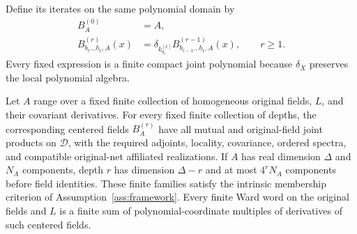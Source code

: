Define its iterates on the same polynomial domain by
\[
 \begin{aligned}
 B_A^{(0)}&=A,\\
 B^{(r)}_{b_r\ldots b_1,A}(x)
   &=\delta_{k_{b_r}^{[x]}}
       B^{(r-1)}_{b_{r-1}\ldots b_1,A}(x),\qquad r\ge1.
 \end{aligned}
\]
Every fixed expression is a finite compact joint polynomial because
\(\delta_X\) preserves the local polynomial algebra.

\begin{proposition}
\label{R:centered-families}
Let $A$ range over a fixed finite collection of homogeneous original
fields, $L$, and their covariant derivatives.  For every fixed finite
collection of depths, the corresponding centered fields $B_A^{(r)}$
have all mutual and original-field joint products on $\mathcal D$,
with the required adjoints, locality, covariance, ordered spectra,
and compatible original-net affiliated realizations.  If $A$ has
real dimension $\Delta$ and $N_A$ components, depth $r$ has dimension
$\Delta-r$ and at most $4^rN_A$ components before field identities.
These finite families satisfy the intrinsic membership criterion of
Assumption~\ref{ass:framework}.  Every finite Ward word on the
original fields and $L$ is a finite sum of polynomial-coordinate
multiples of derivatives of such centered fields.
\end{proposition}

